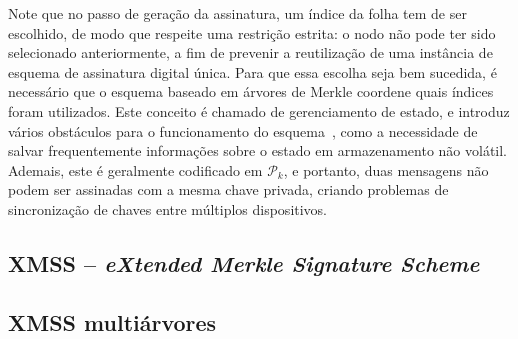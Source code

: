\documentclass[12pt]{report}
\newcommand{\pk}{\mathcal{P}_k}
\begin{document}
Note que no passo de geração da assinatura, um índice da folha tem de ser escolhido, de modo que respeite uma restrição estrita: o nodo não pode ter sido selecionado anteriormente, a fim de prevenir a reutilização de uma instância de esquema de assinatura digital única. Para que essa escolha seja bem sucedida, é necessário que o esquema baseado em árvores de Merkle coordene quais índices foram utilizados. Este conceito é chamado de gerenciamento de estado, e introduz vários obstáculos para o funcionamento do esquema~\cite{McGrew2016}, como a necessidade de salvar frequentemente informações sobre o estado em armazenamento não volátil. Ademais, este é geralmente codificado em $\pk{}$, e portanto, duas mensagens não podem ser assinadas com a mesma chave privada, criando problemas de sincronização de chaves entre múltiplos dispositivos.




\subsection{XMSS -- \emph{eXtended Merkle Signature Scheme}}


\subsection{XMSS multiárvores}
\end{document}
